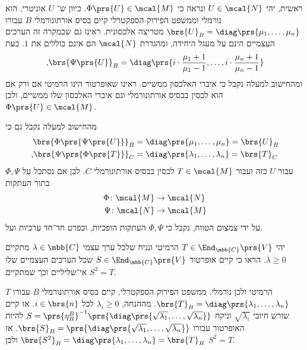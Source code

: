 \documentclass[a4paper,10pt,twoside,openany]{book}
\begin{document}
\begin{solution}
\begin{enumerate}
ראשית, יהי
$U \in \mcal{N}$
ונראה כי
$\Phi\prs{U} \in \mcal{M}$.
כיוון ש־%
$U$
אוניטרי, הוא נורמלי וממשפט הפירוק הספקטרלי קיים בסיס אורתונורמלי
$B$
עבורו
$\brs{U}_B = \diag\prs{\mu_1, \ldots, \mu_n}$
מטריצה אלכסונית. ראינו גם שבמקרה זה הערכים העצמיים הינם על מעגל היחידה, ומהגדרת
$\mcal{N}$
הם אינם כוללים את
$1$.
כעת
\[\text{,} \brs{\Psi\prs{U}}_B = \diag\prs{i \cdot \frac{\mu_1 + 1}{\mu_1 - 1}, \ldots, i \cdot \frac{\mu_n + 1}{\mu_n - 1}}\]
ומהחישוב למעלה נקבל כי איברי האלכסון ממשיים. ראינו שאופרטור הינו הרמיטי אם ורק אם הוא לכסין בבסיס אורתונורמלי וגם איברי האלכסון שלו ממשיים, ולכן
$\Phi\prs{U} \in \mcal{M}$.

מהחישוב למעלה נקבל גם כי
\begin{align*}
\brs{\Phi\prs{\Psi\prs{U}}}_B &= \diag\prs{\mu_1, \ldots, \mu_n} = \brs{U}_B \\
\text{,} \brs{\Psi \prs{\Phi\prs{T}}}_C &= \diag\prs{\lambda_1, \ldots, \lambda_n} = \brs{T}_C 
\end{align*}
עבור
$U$
כזה ועבור
$T \in \mcal{M}$
לכסין בבסיס אורתונורמלי
$C$.
לכן אם נסתכל על
$\Phi, \Psi$
בתור העתקות
\begin{align*}
\Phi \colon \mcal{M} &\to \mcal{N} \\
\Psi \colon \mcal{N} &\to \mcal{M}
\end{align*}
על ידי צמצום הטווח, נקבל כי
$\Phi, \Psi$
העתקות הופכיות, ובפרט חד־חד ערכיות ועל.

\end{enumerate}
\end{solution}

\begin{exercisechap}
יהי
$T \in \End_{\mbb{C}}\prs{V}$
הרמיטי ונניח שלכל ערך עצמי
$\lambda \in \mbb{C}$
מתקיים
$\lambda \geq 0$.
הראו כי קיים אופרטור
$S \in \End_{\mbb{C}}\prs{V}$
שכל הערכים העצמיים שלו אי־שליליים וכך שמתקיים
$S^2 = T$.
\end{exercisechap}

\begin{solution}
$T$
הרמיטי ולכן נורמלי. ממשפט הפירוק הספקטרלי, קיים בסיס אורתונורמלי
$B$
עבורו
$\brs{T}_B = \diag\prs{\lambda_1, \ldots, \lambda_n}$.
מההנחה,
$\lambda_i \geq 0$
לכל
$i \in \brs{n}$.
אז קיים שורש חיובי
$\sqrt{\lambda_i}$
וניקח
$S = \prs{\eta^B_B}^{-1} \prs{\diag\prs{\sqrt{\lambda_1}, \ldots, \sqrt{\lambda_n}}}$
להיות האופרטור עבורו
$\brs{S}_B = \prs{\diag\prs{\sqrt{\lambda_1}, \ldots, \sqrt{\lambda_n}}}$.
אז
$\brs{S^2}_B = \diag\prs{\lambda_1, \ldots, \lambda_n} = \brs{T}_B$
ולכן
$S^2 = T$.
\end{solution}
\end{document}
